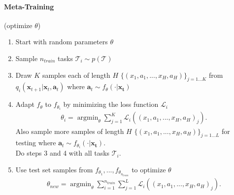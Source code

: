 \documentclass{article}
\DeclareMathOperator*{\argmin}{argmin}
\begin{document}
\paragraph{Meta-Training} (optimize $\theta$) 
	\begin{enumerate}
		\item Start with random parameters $\theta$
		\item Sample $n_{train}$ tasks $\mathcal{T}_i \sim p(\mathcal{T})$
		\item Draw $K$ samples each of length $H$ $\{(x_1, a_1, ..., x_H, a_H)\}_{j=1...K}$ from $q_i(\boldsymbol{x}_{t+1} \vert \boldsymbol{x}_t, \boldsymbol{a}_t)$ where $\boldsymbol{a}_t \sim f_{\theta}( \cdot \vert \boldsymbol{x_t})$
		\item Adapt $f_{\theta}$ to $f_{\theta_i}$ by minimizing the loss function $\mathcal{L}_i$
		\begin{align}
			\theta_i = \argmin_{\theta} \sum_{j=1}^{K} \mathcal{L}_i((x_1, a_1, ..., x_H, a_H)_j).
		\end{align}
		Also sample more samples of length $H$ $\{(x_1, a_1, ..., x_H, a_H)\}_{j=1...L}$ for testing where $\boldsymbol{a}_t \sim f_{\theta_i}( \cdot \vert \boldsymbol{x_t})$.\\
		Do steps 3 and 4 with all tasks $\mathcal{T}_i$.
		\item Use test set samples from $f_{\theta_1}, ..., f_{\theta_{n_{train}}}$ to optimize $\theta$
		\begin{align}
			\theta_{new} = \argmin_{\theta} \sum_{i=1}^{n_{train}} \sum_{j=1}^{L} \mathcal{L}_i((x_1, a_1, ..., x_H, a_H)_j).
		\end{align}
	\end{enumerate}
\end{document}
